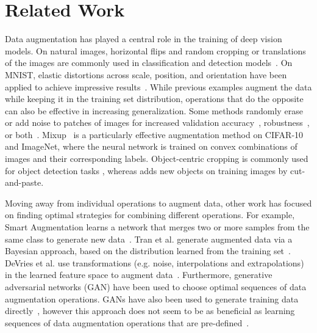 \section{Related Work}

Data augmentation has played a central role in the training of deep vision models. On natural images, horizontal flips and random cropping or translations of the images are commonly used in classification and detection models~\cite{WRN2016,krizhevsky2012imagenet,girshick2018detectron}.  On MNIST, elastic distortions across scale, position, and orientation have been applied to achieve impressive results~\cite{simard2003best,ciregan2012multi,wan2013regularization,sato2015apac}. While previous examples augment the data while keeping it in the training set distribution, operations that do the opposite can also be effective in increasing generalization. Some methods randomly erase or add noise to patches of images for increased validation accuracy~\cite{cutout2017,zhong2017random}, robustness~\cite{szegedy2013intriguing,yin2019afourier,ford2019adversarial}, or both~\cite{lopes2019improving}.  Mixup~\cite{zhang2017mixup} is a particularly effective augmentation method on CIFAR-10 and ImageNet, where the neural network is trained on convex combinations of images and their corresponding labels. Object-centric cropping is commonly used for object detection tasks \cite{liu2016ssd}, whereas \cite{dwibedi2017cut} adds new objects on training images by cut-and-paste.

Moving away from individual operations to augment data, other work has focused on finding optimal strategies for combining different operations. For example, Smart Augmentation learns a network that merges two or more samples from the same class to generate new data~\cite{lemley2017smart}. Tran et al. generate augmented data via a Bayesian approach, based on the distribution learned from the training set~\cite{tran2017bayesian}. DeVries et al. use transformations (e.g. noise, interpolations and extrapolations) in the learned feature space to augment data~\cite{devries2017dataset}. Furthermore, generative adversarial networks (GAN) have been used to choose optimal sequences of data augmentation operations\cite{ratner2017learning}. GANs have also been used to generate training data directly~\cite{perez2017effectiveness,mun2017generative,zhu2017data,antoniou2017data,sixt2016rendergan}, however this approach does not seem to be as beneficial as learning sequences of data augmentation operations that are pre-defined~\cite{ravuri2019classification}.   

